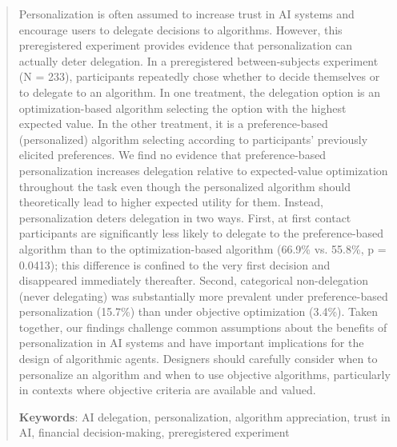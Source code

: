 \begin{abstract}
Personalization is often assumed to increase trust in AI systems and encourage users to delegate decisions to algorithms. However, this preregistered experiment provides evidence that personalization can actually deter delegation. In a preregistered between-subjects experiment (N = 233), participants repeatedly chose whether to decide themselves or to delegate to an algorithm. In one treatment, the delegation option is an optimization-based algorithm selecting the option with the highest expected value. In the other treatment, it is a preference-based (personalized) algorithm selecting according to participants’ previously elicited preferences. We find no evidence that preference-based personalization increases delegation relative to expected-value optimization throughout the task even though the personalized algorithm should theoretically lead to higher expected utility for them. Instead, personalization deters delegation in two ways. First, at first contact participants are significantly less likely to delegate to the preference-based algorithm than to the optimization-based algorithm (66.9\% vs. 55.8\%, p = 0.0413); this difference is confined to the very first decision and disappeared immediately thereafter. 
Second, categorical non-delegation (never delegating) was substantially more prevalent under preference-based personalization (15.7\%) than under objective optimization (3.4\%). 
 Taken together, our findings challenge common assumptions about the benefits of personalization in AI systems and have important implications for the design of algorithmic agents. Designers should carefully consider when to personalize an algorithm and when to use objective algorithms, particularly in contexts where objective criteria are available and valued.

\textbf{Keywords}: AI delegation, personalization, algorithm appreciation, trust in AI, financial decision-making, preregistered experiment
\end{abstract}